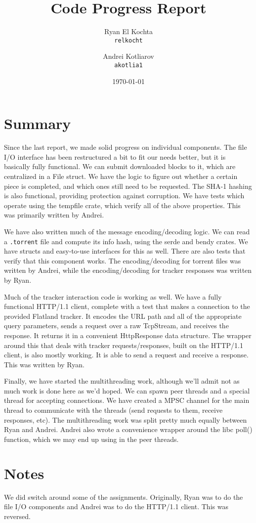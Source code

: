 \documentclass{article}
\title{Code Progress Report}
\author{Ryan El Kochta\\
        \texttt{relkocht}
        \and
        Andrei Kotliarov\\
        \texttt{akotlia1}
        }
\date{\today}
\begin{document}
    \maketitle
    
    \section{Summary}

    Since the last report, we made solid progress on individual components.
    The file I/O interface has been restructured a bit to fit our needs better, but it is basically fully functional.
    We can submit downloaded blocks to it, which are centralized in a File struct.
    We have the logic to figure out whether a certain piece is completed, and which ones still need to be requested.
    The SHA-1 hashing is also functional, providing protection against corruption.
    We have tests which operate using the tempfile crate, which verify all of the above properties.
    This was primarily written by Andrei.

    We have also written much of the message encoding/decoding logic.
    We can read a \verb|.torrent| file and compute its info hash, using the serde and bendy crates.
    We have structs and easy-to-use interfaces for this as well.
    There are also tests that verify that this component works.
    The encoding/decoding for torrent files was written by Andrei, while the encoding/decoding for tracker responses was written by Ryan.

    Much of the tracker interaction code is working as well.
    We have a fully functional HTTP/1.1 client, complete with a test that makes a connection to the provided Flatland tracker.
    It encodes the URL path and all of the appropriate query parameters, sends a request over a raw TcpStream, and receives the response.
    It returns it in a convenient HttpResponse data structure.
    The wrapper around this that deals with tracker requests/responses, built on the HTTP/1.1 client, is also mostly working. It is able to send a request and receive a response.
    This was written by Ryan.

    Finally, we have started the multithreading work, although we'll admit not as much work is done here as we'd hoped.
    We can spawn peer threads and a special thread for accepting connections.
    We have created a MPSC channel for the main thread to communicate with the threads (send requests to them, receive responses, etc).
    The multithreading work was split pretty much equally between Ryan and Andrei.
    Andrei also wrote a convenience wrapper around the libc poll() function, which we may end up using in the peer threads.

    \section{Notes}

    We did switch around some of the assignments.
    Originally, Ryan was to do the file I/O components and Andrei was to do the HTTP/1.1 client.
    This was reversed.
\end{document}

